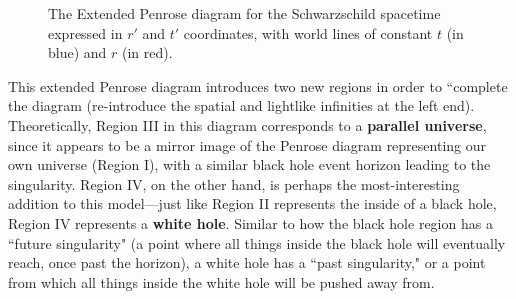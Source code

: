 \documentclass{article}
\def\R{0.25} %
\def\e{0.25} %
\def\ang{45} %
\def\angb{acos(sqrt(\e)*sin(\ang))} %
\def\a{\R*sin(\ang)*sqrt(1-\e*sin(\ang)^2)/(1-\e*sin(\ang)^2)} %
\def\b{\R*sqrt(\e)*sin(\ang)*cos(\ang)/(1-\e*sin(\ang)^2)} %
\def\conefront#1{ %
  \draw[cone] %
    (#1) --++ (45:\R) arc({\angb-90}:{-90-\angb}:{\a} and {\b})
     --++ (-45:2*\R) arc({90-\angb}:{-270+\angb}:{\a} and {\b}) -- cycle;
}
\begin{document}
\begin{figure}[ht]
\begin{center}
\end{center}



\caption{The Extended Penrose diagram for the Schwarzschild spacetime expressed in $r'$ and $t'$ coordinates, with world lines of constant $t$ (in blue) and $r$ (in red).}
\label{fig:penrose_schwarz_ext}
\end{figure}

This extended Penrose diagram introduces two new regions in order to ``complete the diagram (re-introduce the spatial and lightlike infinities at the left end). Theoretically, Region III in this diagram corresponds to a \textbf{parallel universe}, since it appears to be a mirror image of the Penrose diagram representing our own universe (Region I), with a similar black hole event horizon leading to the singularity. Region IV, on the other hand, is perhaps the most-interesting addition to this model---just like Region II represents the inside of a black hole, Region IV represents a \textbf{white hole}. Similar to how the black hole region has a ``future singularity" (a point where all things inside the black hole will eventually reach, once past the horizon), a white hole has a ``past singularity," or a point from which all things inside the white hole will be pushed away from. 
\end{document}
